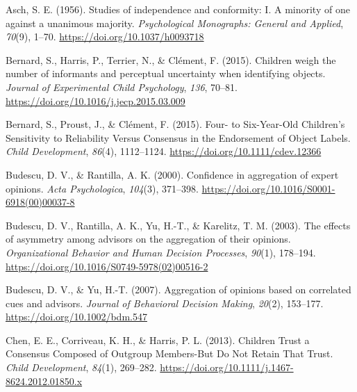 \documentclass[
  doc,floatsintext]{apa6}
\newlength{\cslhangindent}
\newlength{\cslentryspacingunit} %
\newenvironment{CSLReferences}[2] %
 {%
  \setlength{\parindent}{0pt}
  \ifodd #1
  \let\oldpar\par
  \def\par{\hangindent=\cslhangindent\oldpar}
  \fi
  \setlength{\parskip}{#2\cslentryspacingunit}
 }%
 {}
\begin{document}
\hypertarget{refs}{}
\begin{CSLReferences}{1}{0}
\leavevmode{}%
Asch, S. E. (1956). Studies of independence and conformity: I. A minority of one against a unanimous majority. \emph{Psychological Monographs: General and Applied}, \emph{70}(9), 1--70. \url{https://doi.org/10.1037/h0093718}

\leavevmode{}%
Bernard, S., Harris, P., Terrier, N., \& Clément, F. (2015). Children weigh the number of informants and perceptual uncertainty when identifying objects. \emph{Journal of Experimental Child Psychology}, \emph{136}, 70--81. \url{https://doi.org/10.1016/j.jecp.2015.03.009}

\leavevmode{}%
Bernard, S., Proust, J., \& Clément, F. (2015). Four- to Six-Year-Old Children's Sensitivity to Reliability Versus Consensus in the Endorsement of Object Labels. \emph{Child Development}, \emph{86}(4), 1112--1124. \url{https://doi.org/10.1111/cdev.12366}

\leavevmode{}%
Budescu, D. V., \& Rantilla, A. K. (2000). Confidence in aggregation of expert opinions. \emph{Acta Psychologica}, \emph{104}(3), 371--398. \url{https://doi.org/10.1016/S0001-6918(00)00037-8}

\leavevmode{}%
Budescu, D. V., Rantilla, A. K., Yu, H.-T., \& Karelitz, T. M. (2003). The effects of asymmetry among advisors on the aggregation of their opinions. \emph{Organizational Behavior and Human Decision Processes}, \emph{90}(1), 178--194. \url{https://doi.org/10.1016/S0749-5978(02)00516-2}

\leavevmode{}%
Budescu, D. V., \& Yu, H.-T. (2007). Aggregation of opinions based on correlated cues and advisors. \emph{Journal of Behavioral Decision Making}, \emph{20}(2), 153--177. \url{https://doi.org/10.1002/bdm.547}

\leavevmode{}%
Chen, E. E., Corriveau, K. H., \& Harris, P. L. (2013). Children Trust a Consensus Composed of Outgroup Members-But Do Not Retain That Trust. \emph{Child Development}, \emph{84}(1), 269--282. \url{https://doi.org/10.1111/j.1467-8624.2012.01850.x}


\end{CSLReferences}
\end{document}
